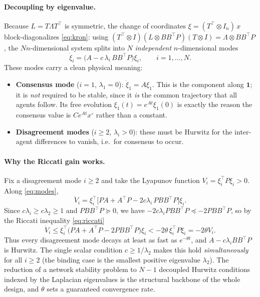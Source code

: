 \documentclass[11pt,a4paper]{article}
\theoremstyle{remark}
\newcommand{\kron}{\otimes}
\newcommand{\T}{^{\top}}
\begin{document}
\paragraph{Decoupling by eigenvalue.} Because $L=T\Lambda T\T$ is symmetric, the change of
coordinates $\xi=(T\T\kron I_n)\,x$ block-diagonalizes \eqref{eq:kron}: using
$(T\T\kron I)(L\kron BB\T P)(T\kron I)=\Lambda\kron BB\T P$, the $Nn$-dimensional system splits into
$N$ \emph{independent} $n$-dimensional modes
\begin{equation}
\dot\xi_i = \big(A - c\,\lambda_i\,BB\T P\big)\xi_i, \qquad i=1,\dots,N.
\label{eq:modes}
\end{equation}
These modes carry a clean physical meaning:
\begin{itemize}\itemsep2pt
\item \textbf{Consensus mode} ($i=1$, $\lambda_1=0$): $\dot\xi_1=A\xi_1$. This is the component along
$\mathbf 1$; it is \emph{not} required to be stable, since it \emph{is} the common trajectory that all
agents follow. Its free evolution $\xi_1(t)=e^{At}\xi_1(0)$ is exactly the reason the consensus value
is $Ce^{At}x^\circ$ rather than a constant.
\item \textbf{Disagreement modes} ($i\ge 2$, $\lambda_i>0$): these must be Hurwitz for the
inter-agent differences to vanish, i.e.\ for consensus to occur.
\end{itemize}

\paragraph{Why the Riccati gain works.} Fix a disagreement mode $i\ge 2$ and take the Lyapunov
function $V_i=\xi_i\T P\xi_i>0$. Along \eqref{eq:modes},
\begin{equation}
\dot V_i = \xi_i\T\!\big[PA+A\T P - 2c\lambda_i\,PBB\T P\big]\xi_i .
\label{eq:Vi}
\end{equation}
Since $c\lambda_i\ge c\lambda_2\ge 1$ and $PBB\T P\succeq 0$, we have
$-2c\lambda_i PBB\T P\preceq -2PBB\T P$, so by the Riccati inequality \eqref{eq:riccati}
\begin{equation}
\dot V_i \le \xi_i\T\big(PA+A\T P-2PBB\T P\big)\xi_i < -2\theta\,\xi_i\T P\xi_i = -2\theta V_i .
\label{eq:expo}
\end{equation}
Thus every disagreement mode decays at least as fast as $e^{-\theta t}$, and $A-c\lambda_i BB\T P$ is
Hurwitz. The single scalar condition $c\ge 1/\lambda_2$ makes this hold \emph{simultaneously} for all
$i\ge 2$ (the binding case is the smallest positive eigenvalue $\lambda_2$). The reduction of a
network stability problem to $N-1$ decoupled Hurwitz conditions indexed by the Laplacian eigenvalues
is the structural backbone of the whole design, and $\theta$ sets a guaranteed convergence rate.
\end{document}

